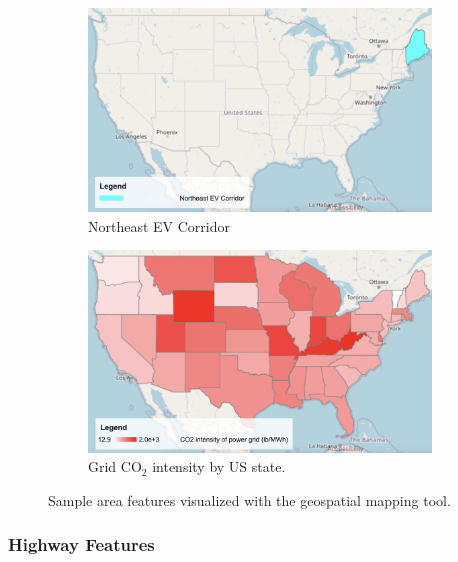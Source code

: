 \begin{figure}[ht]
    \centering
    \begin{subfigure}[b]{0.49\textwidth}
        \centering
        \includegraphics[width=\textwidth]{figures/northeast_ev_corridor.png}
        \caption{Northeast EV Corridor}
        \label{fig:northeast_ev_corridor}
    \end{subfigure}
    \hfill
    \begin{subfigure}[b]{0.49\textwidth}
        \centering
        \includegraphics[width=\textwidth]{figures/grid_co2_intensity_state.png}
        \caption{Grid CO$_2$ intensity by US state.}
        \label{fig:grid_co2_intensity_state}
    \end{subfigure}
    \caption{Sample area features visualized with the geospatial mapping tool.}
    \label{fig:area_features}
\end{figure}

\subsubsection{Highway Features}

